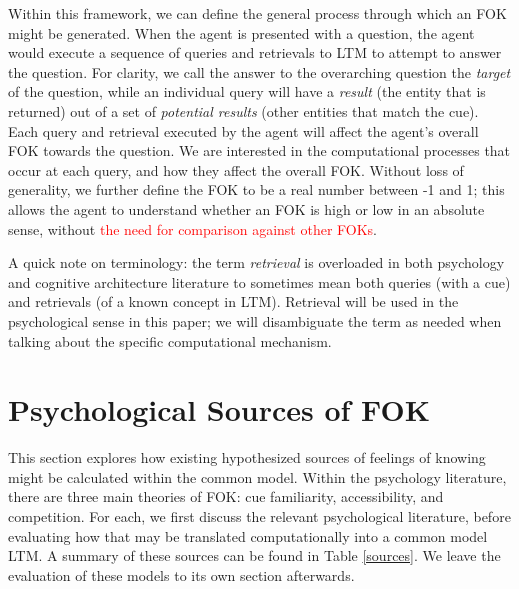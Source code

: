 \documentclass[10pt,letterpaper]{article}
\newcommand{\fixme}[2][]{#2}
\renewcommand{\fixme}[2][]{\textcolor{red}{#2}}
\begin{document}
Within this framework, we can define the general process through which an FOK might be generated.
When the agent is presented with a question, the agent would execute a sequence of queries and retrievals to LTM to attempt to answer the question.
For clarity, we call the answer to the overarching question the \emph{target} of the question, while an individual query will have a \emph{result} (the entity that is returned) out of a set of \emph{potential results} (other entities that match the cue).
Each query and retrieval executed by the agent will affect the agent's overall FOK towards the question.
We are interested in the computational processes that occur at each query, and how they affect the overall FOK.
Without loss of generality, we further define the FOK to be a real number between -1 and 1; this allows the agent to understand whether an FOK is high or low in an absolute sense, without \fixme[I'm not sure how that would work]{the need for comparison against other FOKs}.

A quick note on terminology: the term \emph{retrieval} is overloaded in both psychology and cognitive architecture literature to sometimes mean both queries (with a cue) and retrievals (of a known concept in LTM).
Retrieval will be used in the psychological sense in this paper; we will disambiguate the term as needed when talking about the specific computational mechanism.


\section{Psychological Sources of FOK}

This section explores how existing hypothesized sources of feelings of knowing might be calculated within the common model.
Within the psychology literature, there are three main theories of FOK: cue familiarity, accessibility, and competition.
For each, we first discuss the relevant psychological literature, before evaluating how that may be translated computationally into a common model LTM.
A summary of these sources can be found in Table \ref{sources}.
We leave the evaluation of these models to its own section afterwards.
\end{document}
